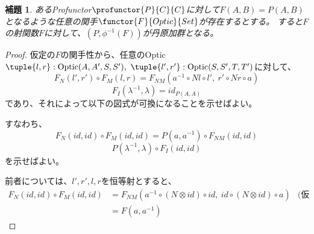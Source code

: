 \documentclass[uplatex,dvipdfmx]{jsarticle}
\newtheorem{lemma}[proof]{補題}
\begin{document}
  \begin{lemma}
    あるProfunctor$\profunctor{P}{C}{C}$に対して$F(A,B)=P(A,B)$となるような任意の関手$\functor{F}{Optic}{Set}$が存在するとする。
    すると$F$の射関数$F$に対して、$(P,\phi^{-1}(F))$が丹原加群となる。
  \end{lemma}
  \begin{proof}
    仮定の$F$の関手性から、任意のOptic$\tuple{l,r}:\mathrm{Optic}(A,A',S,S'),\ \tuple{l',r'}:\mathrm{Optic}(S,S',T,T')$に対して、\[F_N(l',r')\circ F_M(l,r) = F_{NM}(a^{-1}\circ Nl\circ l',\ r'\circ Nr\circ a)\]
    \[F_I(\lambda^{-1},\lambda)=id_{P(A,A)}\]であり、それによって以下の図式が可換になることを示せばよい。
      \begin{center}
      \end{center}
      \begin{center}
      \end{center}
      すなわち、\[F_N(id,id)\circ F_M(id,id) = P(a,a^{-1})\circ F_{NM}(id,id)\]
      \[P(\lambda^{-1},\lambda)\circ F_I(id,id)\]を示せばよい。

      前者については、$l',r',l,r$を恒等射とすると、
      \begin{align*}
        F_N(id,id)\circ F_M(id,id) &=F_{NM}(a^{-1}\circ (N\otimes id)\circ id,\ id\circ (N\otimes id)\circ a) &\text{(仮定)}\\
        &=F(a,a^{-1})
      \end{align*}
  \end{proof}
\end{document}
